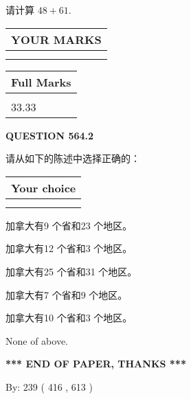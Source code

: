 \documentclass{ctexart}
\begin{document}
  
 
请计算 $ %
48 +  %
61 $.
 

 

 
  
\vspace{0.2in}
  
\noindent\begin{tabular}{|l|}
\hline
 YOUR MARKS  \\
\hline
 \\ 
 \\ 
\hline
\end{tabular}
\hspace{0.05in} \begin{tabular}{|l|}
\hline
 Full Marks  \\
\hline
 \\ 
33.33 \\
\hline
\end{tabular}
{\textbf{\Large{QUESTION
564.2 
}}}
  
  
请从如下的陈述中选择正确的：
  
  
\noindent\hspace{3.0in} \begin{tabular}{|l|}
\hline
Your choice \\
\hline
 \\ 
 \\ 
\hline
\end{tabular}
  
  
 
 
加拿大有9 个省和23 个地区。
 
 
加拿大有12 个省和3 个地区。
 
 
加拿大有25 个省和31 个地区。
 
 
加拿大有7 个省和9 个地区。
 
 
加拿大有10 个省和3 个地区。
 
 
 None of above.
 
 
   
   
 \vspace{0.2in}
 
   
   
   
   
\vspace{1.0in} 
{\textbf{\large{ *** END OF PAPER, THANKS *** }}} 
   
   
\hspace{1.0in} By: 
 239 ( 416 ,  613 )
   
\end{document}
